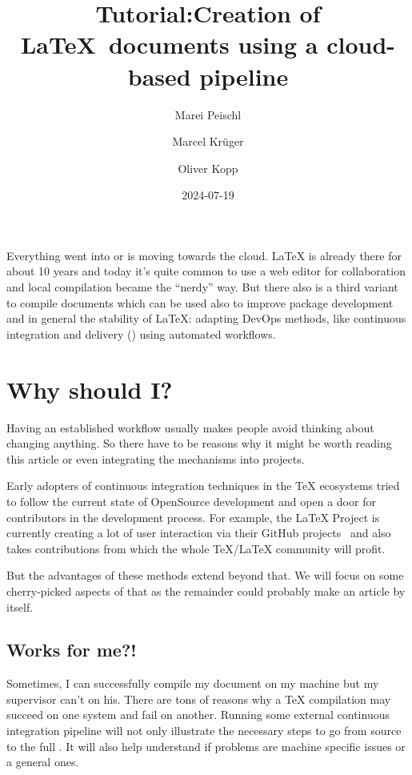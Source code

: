 \documentclass[final]{ltugboat}
\title[TUG2024: LaTeX CI/CD]{Tutorial:\newline Creation of \LaTeX\ documents using a cloud-based pipeline}
\date{2024-07-19}
\author{Marei Peischl}
\author{Marcel Krüger}
\author{Oliver Kopp}
\begin{document}
\newlength{\mintednumbersep}
%
\setlength\mintednumbersep{1em}%
\addtolength{}%

\maketitle

Everything went into or is moving towards the cloud.
\LaTeX{} is already there for about 10 years and today it's quite common to use a web editor for collaboration and local compilation became the \enquote{nerdy} way.
But there also is a third variant to compile documents which can be used also to improve package development and in general the stability of \LaTeX{}:
adapting DevOps methods, like continuous integration and delivery () using automated workflows.

\section{Why should I?}
Having an established workflow usually makes people avoid thinking about changing anything.
So there have to be reasons why it might be worth reading this article or even integrating the mechanisms into projects.

Early adopters of continuous integration techniques in the TeX ecosystems tried to follow the current state of OpenSource development and open a door for contributors in the development process.
For example, the \LaTeX{} Project is currently creating a lot of user interaction via their GitHub projects~\cite{latex3-github} and also takes contributions from which the whole \TeX/\LaTeX{} community will profit.

But the advantages of these methods extend beyond that. We will focus on some cherry-picked aspects of that as the remainder could probably make an article by itself.

\subsection{Works for me?!}
Sometimes, I can successfully compile my document on my machine but my supervisor can't on his.
There are tons of reasons why a TeX compilation may succeed on one system and fail on another.
Running some external continuous integration pipeline will not only illustrate the necessary steps to go from source to the full .
It will also help understand if problems are machine specific issues or a general ones.
\end{document}
